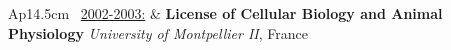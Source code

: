 
\begin{tabular}{Ap{14.5cm}}
\textbullet~\underline{2002-2003:} & \textbf{License of Cellular Biology and Animal Physiology} \newline
				     \normalsize \textit{University of Montpellier II}, France \\
\end{tabular}


%
